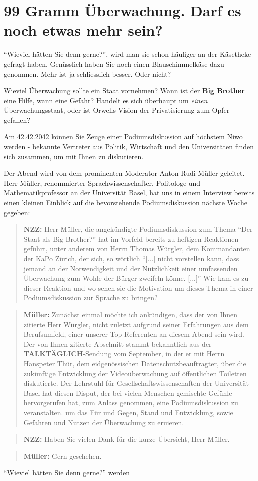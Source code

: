 \documentclass{scrartcl}
\begin{document}
\section*{99 Gramm Überwachung. Darf es noch etwas mehr sein?}
"`Wieviel hätten Sie denn gerne?"', wird man sie schon
häufiger an der Käsetheke gefragt haben. Genüsslich haben
Sie noch einen Blauschimmelkäse dazu genommen. Mehr ist ja
schliesslich besser. Oder nicht?

Wieviel Überwachung sollte ein Staat vornehmen? Wann ist
der \textbf{Big Brother} eine Hilfe, wann eine Gefahr?
Handelt es sich überhaupt um \textit{einen} Überwachungsstaat,
oder ist Orwells Vision der Privatisierung zum Opfer gefallen?

Am 42.42.2042 können Sie Zeuge einer Podiumsdiskussion auf
höchstem Niwo werden - bekannte Vertreter aus Politik, Wirtschaft
und den Universitäten finden sich zusammen, um mit Ihnen
zu diskutieren.

Der Abend wird von dem prominenten Moderator Anton Rudi Müller
geleitet. Herr Müller, renommierter Sprachwissenschafter, Politologe
und Mathematikprofessor an der Universität Basel, hat uns in
einem Interview bereits einen kleinen Einblick auf die 
bevorstehende Podiumsdiskussion nächste Woche gegeben:

\begin{quote}
\textbf{NZZ:} Herr Müller, die angekündigte Podiumsdiskussion zum Thema
"`Der Staat als Big Brother?"' hat im Vorfeld bereits zu
heftigen Reaktionen geführt, unter anderem von Herrn
Thomas Würgler, dem Kommandanten der KaPo Zürich, der
sich, so wörtlich "`[...] nicht vorstellen kann, dass jemand
an der Notwendigkeit und der Nützlichkeit einer umfassenden
Überwachung zum Wohle der Bürger zweifeln könne. [...]"'
Wie kam es zu dieser Reaktion und wo sehen sie die Motivation
um dieses Thema in einer Podiumsdiskussion zur Sprache zu
bringen?
\end{quote}
\begin{quote}
\textbf{Müller:} Zunächst einmal möchte ich ankündigen, dass
der von Ihnen zitierte Herr Würgler, nicht zuletzt aufgrund
seiner Erfahrungen aus dem Berufsumfeld, einer unserer Top-Referenten
an diesem Abend sein wird. Der von Ihnen zitierte Abschnitt stammt
bekanntlich aus der \textbf{TALKTÄGLICH}-Sendung vom September,
in der er mit Herrn Hanspeter Thür,
dem eidgenössischen Datenschutzbeauftragter, über die zukünftige
Entwicklung der Videoüberwachung auf öffentlichen Toiletten
diskutierte. 
Der Lehrstuhl für Gesellschaftswissenschaften der Universität Basel
hat diesen Disput, der bei vielen Menschen gemischte Gefühle
hervorgerufen hat, zum Anlass genommen, eine Podiumsdiskussion
zu veranstalten. um das Für und Gegen, Stand und Entwicklung,
sowie Gefahren und Nutzen der Überwachung zu eruieren.
\end{quote}
\begin{quote}
\textbf{NZZ:} Haben Sie vielen Dank für die kurze Übersicht,
Herr Müller.
\end{quote}
\begin{quote}
\textbf{Müller:} Gern geschehen.
\end{quote}

"`Wieviel hätten Sie denn gerne?"' werden 
\end{document}
